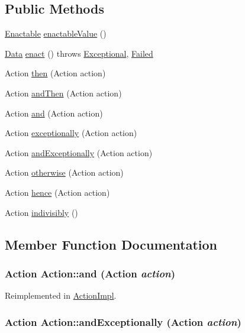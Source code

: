 \subsection*{Public Methods}
\begin{CompactItemize}
\item 
\hyperlink{interfaceEnactable}{Enactable} \hyperlink{interfaceAction_a0}{enactable\-Value} ()
\item 
\hyperlink{interfaceData}{Data} \hyperlink{interfaceAction_a1}{enact} () throws \hyperlink{classExceptional}{Exceptional}, \hyperlink{classFailed}{Failed}
\item 
Action \hyperlink{interfaceAction_a2}{then} (Action action)
\item 
Action \hyperlink{interfaceAction_a3}{and\-Then} (Action action)
\item 
Action \hyperlink{interfaceAction_a4}{and} (Action action)
\item 
Action \hyperlink{interfaceAction_a5}{exceptionally} (Action action)
\item 
Action \hyperlink{interfaceAction_a6}{and\-Exceptionally} (Action action)
\item 
Action \hyperlink{interfaceAction_a7}{otherwise} (Action action)
\item 
Action \hyperlink{interfaceAction_a8}{hence} (Action action)
\item 
Action \hyperlink{interfaceAction_a9}{indivisibly} ()
\end{CompactItemize}


\subsection{Member Function Documentation}
\hypertarget{interfaceAction_a4}{
\subsubsection[and]{\setlength{\rightskip}{0pt plus 5cm}Action Action::and (Action {\em action})}}
\label{interfaceAction_a4}




Reimplemented in \hyperlink{classActionImpl_a14}{Action\-Impl}.\hypertarget{interfaceAction_a6}{
\subsubsection[andExceptionally]{\setlength{\rightskip}{0pt plus 5cm}Action Action::and\-Exceptionally (Action {\em action})}}
\label{interfaceAction_a6}




